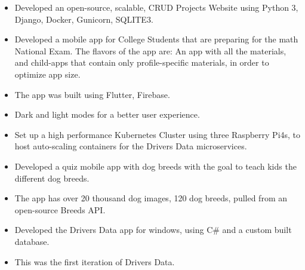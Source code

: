 \documentclass[10pt,a4paper,ragged2e]{resume}
\begin{document}
\begin{fullwidth}
        \begin{itemize}
            \item Developed an open-source, scalable, CRUD Projects Website using Python 3, Django, Docker, Gunicorn, SQLITE3.
            \smallskip
        \end{itemize}
        \divider

        \begin{itemize}
            \item Developed a mobile app for College Students that are preparing for the math National Exam. The flavors of the app are: An app with all the materials, and child-apps that contain only profile-specific materials, in order to optimize app size.
            \item The app was built using Flutter, Firebase.
            \item Dark and light modes for a better user experience.
            \smallskip
        \end{itemize}
        \divider

        \begin{itemize}
            \item Set up a high performance Kubernetes Cluster using three Raspberry Pi4s, to host auto-scaling containers for the Drivers Data microservices.
            \smallskip
        \end{itemize}
        \divider

        \begin{itemize}
            \item Developed a quiz mobile app with dog breeds with the goal to teach kids the different dog breeds.
            \item The app has over 20 thousand dog images, 120 dog breeds, pulled from an open-source Breeds API.
            \smallskip
        \end{itemize}
        \divider

        \begin{itemize}
            \item Developed the Drivers Data app for windows, using C\# and a custom built database.
            \item This was the first iteration of Drivers Data.
            \smallskip
        \end{itemize}
    \end{fullwidth}



    \clearpage\nocite{*}
\end{document}

